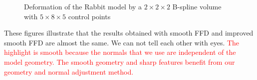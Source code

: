 \documentclass[3p]{elsarticle}
\begin{document}
\begin{figure}[htbp]
\begin{center}
	\begin{minipage}[c]{0.63\textwidth}
		\centering
		\caption{Deformation of the Rabbit model by a $2\times2\times2$ B-spline volume with $5\times8\times5$ control points}
		\label{fig:rabbit}
	\end{minipage}
\end{center}
\end{figure}

These figures illustrate that the results obtained with smooth FFD and improved smooth FFD are almost the same. We can not tell each other with eyes.
\textcolor{red}{The highlight is smooth because the normals that we use are independent of the model geometry. The smooth geometry and sharp features benefit from our geometry and normal adjustment method.}
\end{document}
